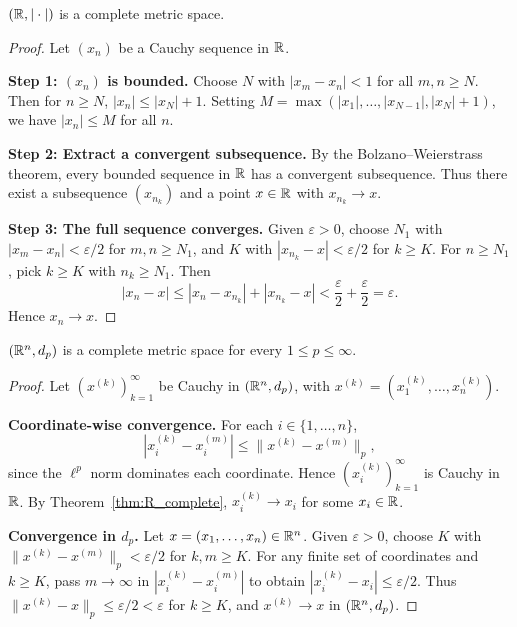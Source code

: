 \documentclass[11pt,a4paper]{article}
\begin{document}
\begin{theorem}[Completeness of $\R$]
\label{thm:R_complete}
$(\mathbb{R}, |\cdot|)$ is a complete metric space.
\end{theorem}

\begin{proof}
Let $(x_n)$ be a Cauchy sequence in $\R$.

\textbf{Step 1: $(x_n)$ is bounded.} Choose $N$ with $|x_m - x_n| < 1$ for
all $m, n \ge N$. Then for $n \ge N$, $|x_n| \le |x_N| + 1$. Setting
$M = \max(|x_1|, \ldots, |x_{N-1}|, |x_N| + 1)$, we have $|x_n| \le M$ for
all $n$.

\textbf{Step 2: Extract a convergent subsequence.} By the Bolzano--Weierstrass
theorem, every bounded sequence in $\R$ has a convergent subsequence. Thus
there exist a subsequence $(x_{n_k})$ and a point $x \in \mathbb{R}$ with
$x_{n_k} \to x$.

\textbf{Step 3: The full sequence converges.} Given $\varepsilon > 0$, choose
$N_1$ with $|x_m - x_n| < \varepsilon/2$ for $m, n \ge N_1$, and $K$ with
$|x_{n_k} - x| < \varepsilon/2$ for $k \ge K$. For $n \ge N_1$, pick
$k \ge K$ with $n_k \ge N_1$. Then
\[
|x_n - x| \le |x_n - x_{n_k}| + |x_{n_k} - x| < \frac{\varepsilon}{2}
  + \frac{\varepsilon}{2} = \varepsilon.
\]
Hence $x_n \to x$.
\end{proof}

\begin{theorem}[Completeness of $\R^n$]
\label{thm:Rn_complete}
$(\mathbb{R}^n, d_p)$ is a complete metric space for every $1 \le p \le \infty$.
\end{theorem}

\begin{proof}
Let $(x^{(k)})_{k=1}^\infty$ be Cauchy in $(\mathbb{R}^n, d_p)$, with
$x^{(k)} = (x_1^{(k)}, \ldots, x_n^{(k)})$.

\textbf{Coordinate-wise convergence.} For each $i \in \{1, \ldots, n\}$,
\[
|x_i^{(k)} - x_i^{(m)}| \le \|x^{(k)} - x^{(m)}\|_p,
\]
since the $\ell^p$ norm dominates each coordinate. Hence
$(x_i^{(k)})_{k=1}^\infty$ is Cauchy in $\R$. By
Theorem~\ref{thm:R_complete}, $x_i^{(k)} \to x_i$ for some $x_i \in \mathbb{R}$.

\textbf{Convergence in $d_p$.} Let $x = (x_1, \ldots, x_n) \in \mathbb{R}^n$. Given
$\varepsilon > 0$, choose $K$ with $\|x^{(k)} - x^{(m)}\|_p < \varepsilon/2$
for $k, m \ge K$. For any finite set of coordinates and $k \ge K$, pass
$m \to \infty$ in $|x_i^{(k)} - x_i^{(m)}|$ to obtain
$|x_i^{(k)} - x_i| \le \varepsilon/2$. Thus
$\|x^{(k)} - x\|_p \le \varepsilon/2 < \varepsilon$ for $k \ge K$, and
$x^{(k)} \to x$ in $(\mathbb{R}^n, d_p)$.
\end{proof}
\end{document}
